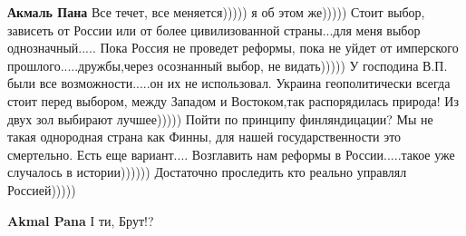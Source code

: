 \begin{itemize}
\begin{itemize}
 
\textbf{Акмаль Пана} Все течет, все меняется))))) я об этом же))))) Стоит выбор, зависеть от России или от более цивилизованной страны...для меня выбор однозначный..... Пока Россия не проведет реформы, пока не уйдет от имперского прошлого.....дружбы,через осознанный выбор, не видать))))) У господина В.П. были все возможности.....он их не использовал. Украина геополитически всегда стоит перед выбором, между Западом и Востоком,так распорядилась природа! Из двух зол выбирают лучшее))))) Пойти по принципу финляндицации? Мы не такая однородная страна как Финны, для нашей государственности это смертельно. Есть еще вариант.... Возглавить нам реформы в России.....такое уже случалось в истории)))))) Достаточно проследить кто реально управлял Россией)))))

 
\textbf{Akmal Pana} І ти, Брут!?

\end{itemize}

\end{itemize}

